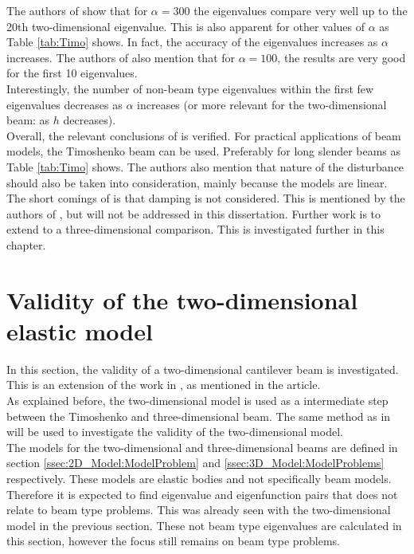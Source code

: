 \documentclass[../../main.tex]{subfiles}
\begin{document}
The authors of \cite{LVV09} show that for $\alpha = 300$ the eigenvalues compare very well up to the 20th two-dimensional eigenvalue. This is also apparent for other values of $\alpha$ as Table \ref{tab:Timo} shows. In fact, the accuracy of the eigenvalues increases as $\alpha$ increases. The authors of \cite{LVV09} also mention that for $\alpha = 100$, the results are very good for the first 10 eigenvalues.\\

Interestingly, the number of non-beam type eigenvalues within the first few eigenvalues decreases as $\alpha$ increases (or more relevant for the two-dimensional beam: as $h$ decreases).\\

Overall, the relevant conclusions of \cite{LVV09} is verified. For practical applications of beam models, the Timoshenko beam can be used. Preferably for long slender beams as Table \ref{tab:Timo} shows. The authors also mention that nature of the disturbance should also be taken into consideration, mainly because the models are linear.\\

 The short comings of \cite{LVV09} is that damping is not considered. This is mentioned by the authors of \cite{LVV09}, but will not be addressed in this dissertation. Further work is to extend \cite{LVV09} to a three-dimensional comparison. This is investigated further in this chapter.\\

\section{Validity of the two-dimensional elastic model}
In this section, the validity of a two-dimensional cantilever beam is investigated. This is an extension of the work in \cite{LVV09}, as mentioned in the article.\\

As explained before, the two-dimensional model is used as a intermediate step between the Timoshenko and three-dimensional beam. The same method as in \cite{LVV09} will be used to investigate the validity of the two-dimensional model.\\

The models for the two-dimensional and three-dimensional beams are defined in section \ref{ssec:2D_Model:ModelProblem} and \ref{ssec:3D_Model:ModelProblems} respectively. These models are elastic bodies and not specifically beam models. Therefore it is expected to find eigenvalue and eigenfunction pairs that does not relate to beam type problems. This was already seen with the two-dimensional model in the previous section. These not beam type eigenvalues are calculated in this section, however the focus still remains on beam type problems.\\
\end{document}
